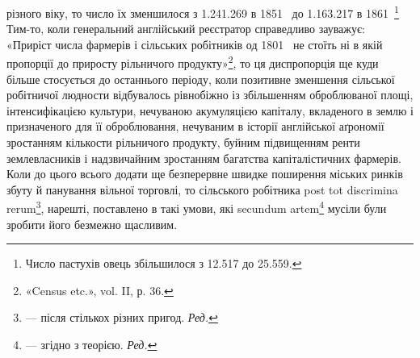 \parcont{}  %
різного віку, то число їх зменшилося з \num{1.241.269} в 1851~ до
\num{1.163.217} в 1861~\footnote{
Число пастухів овець збільшилося з \num{12.517} до \num{25.559}.
} Тим-то, коли генеральний англійський
реєстратор справедливо зауважує: «Приріст числа фармерів і
сільських робітників од 1801~ не стоїть ні в якій пропорції
до приросту рільничого продукту»\footnote{
«Census etc.», vol. II, р. 36.
}, то ця диспропорція ще
куди більше стосується до останнього періоду, коли позитивне
зменшення сільської робітничої людности відбувалось рівнобіжно
із збільшенням оброблюваної площі, інтенсифікацією культури,
нечуваною акумуляцією капіталу, вкладеного в землю і призначеного
для її оброблювання, нечуваним в історії англійської
аґрономії зростанням кількости рільничого продукту, буйним
підвищенням ренти землевласників і надзвичайним зростанням
багатства капіталістичних фармерів. Коли до цього всього додати
ще безперервне швидке поширення міських ринків збуту й
панування вільної торговлі, то сільського робітника post tot
discrimina rerum\footnote*{
— після стількох різних пригод. \emph{Ред.}
}, нарешті, поставлено в такі умови, які secundum
artem\footnote*{
— згідно з теорією. \emph{Ред.}
} мусіли були зробити його безмежно щасливим.

